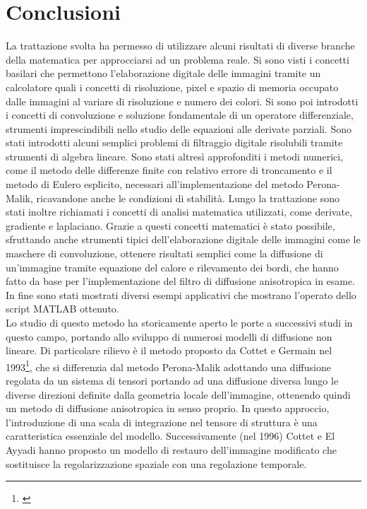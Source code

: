 \newpage
\section{Conclusioni}
La trattazione svolta ha permesso di utilizzare alcuni risultati di diverse branche della matematica per approcciarsi ad un problema reale. Si sono visti i concetti basilari che permettono l'elaborazione digitale delle immagini tramite un calcolatore quali i concetti di risoluzione, pixel e spazio di memoria occupato dalle immagini al variare di risoluzione e numero dei colori. Si sono poi introdotti i concetti di convoluzione e soluzione fondamentale di un operatore differenziale, strumenti imprescindibili nello studio delle equazioni alle derivate parziali. Sono stati introdotti alcuni semplici problemi di filtraggio digitale risolubili tramite strumenti di algebra lineare. Sono stati altresì approfonditi i metodi numerici, come il metodo delle differenze finite con relativo errore di troncamento e il metodo di Eulero esplicito, necessari all'implementazione del metodo Perona-Malik, ricavandone anche le condizioni di stabilità. Lungo la trattazione sono stati inoltre richiamati i concetti di analisi matematica utilizzati, come derivate, gradiente e laplaciano. Grazie a questi concetti matematici è stato possibile, sfruttando anche strumenti tipici dell'elaborazione digitale delle immagini come le maschere di convoluzione, ottenere risultati semplici come la diffusione di un'immagine tramite equazione del calore e rilevamento dei bordi, che hanno fatto da base per l'implementazione del filtro di diffusione anisotropica in esame.
In fine sono stati mostrati diversi esempi applicativi che mostrano l'operato dello script MATLAB ottenuto.\\
Lo studio di questo metodo ha storicamente aperto le porte a successivi studi in questo campo, portando allo sviluppo di numerosi modelli di diffusione non lineare. Di particolare rilievo è il metodo proposto da Cottet e Germain nel 1993\footnote{\cite{Weickert}}, che si differenzia dal metodo Perona-Malik adottando una diffusione regolata da un sistema di tensori portando ad una diffusione diversa lungo le diverse direzioni definite dalla geometria locale dell'immagine, ottenendo quindi un metodo di diffusione anisotropica in senso proprio. In questo approccio, l'introduzione di una scala di integrazione nel tensore di struttura è una caratteristica essenziale del modello. Successivamente (nel 1996) Cottet e El Ayyadi hanno proposto un modello di restauro dell'immagine modificato che sostituisce la regolarizzazione spaziale con una regolazione temporale.\\
